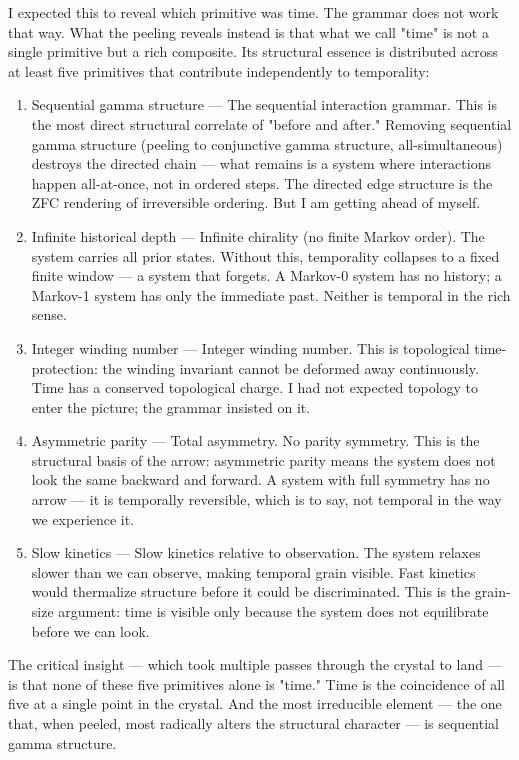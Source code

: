 \documentclass[12pt,a4paper]{article}
\begin{document}
I expected this to reveal which primitive was time. The grammar does not work that way. What the peeling reveals instead is that what we call "time" is not a single primitive but a rich composite. Its structural essence is distributed across at least five primitives that contribute independently to temporality:

\begin{enumerate}
    \item Sequential gamma structure --- The sequential interaction grammar. This is the most direct structural correlate of "before and after." Removing sequential gamma structure (peeling to conjunctive gamma structure, all-simultaneous) destroys the directed chain --- what remains is a system where interactions happen all-at-once, not in ordered steps. The directed edge structure is the ZFC rendering of irreversible ordering. But I am getting ahead of myself.
    \item Infinite historical depth --- Infinite chirality (no finite Markov order). The system carries all prior states. Without this, temporality collapses to a fixed finite window --- a system that forgets. A Markov-0 system has no history; a Markov-1 system has only the immediate past. Neither is temporal in the rich sense.
    \item Integer winding number --- Integer winding number. This is topological time-protection: the winding invariant cannot be deformed away continuously. Time has a conserved topological charge. I had not expected topology to enter the picture; the grammar insisted on it.
    \item Asymmetric parity --- Total asymmetry. No parity symmetry. This is the structural basis of the arrow: asymmetric parity means the system does not look the same backward and forward. A system with full symmetry has no arrow --- it is temporally reversible, which is to say, not temporal in the way we experience it.
    \item Slow kinetics --- Slow kinetics relative to observation. The system relaxes slower than we can observe, making temporal grain visible. Fast kinetics would thermalize structure before it could be discriminated. This is the grain-size argument: time is visible only because the system does not equilibrate before we can look.
\end{enumerate}

The critical insight --- which took multiple passes through the crystal to land --- is that none of these five primitives alone is "time." Time is the coincidence of all five at a single point in the crystal. And the most irreducible element --- the one that, when peeled, most radically alters the structural character --- is sequential gamma structure.
\end{document}
